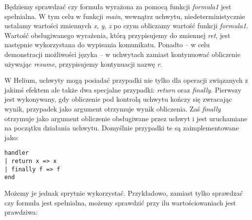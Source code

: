 

Będziemy sprawdzać czy formuła wyrażona za pomocą funkcji \textit{formula1} jest spełnialna. W tym celu w funkcji \textit{main}, wewnątrz uchwytu, niedeterministycznie ustalamy wartości zmiennych \textit{x}, \textit{y}, \textit{z} po czym obliczamy wartość funkcji \textit{formula1}. Wartość obsługiwanego wyrażenia, którą przypisujemy do zmiennej \textit{ret}, jest następnie wykorzystana do wypisania komunikatu. Ponadto -- w celu demonstracji możliwości języka -- w uchwytach zamiast kontynuować obliczenie używając \textit{resume}, przypisujemy kontynuacji nazwę \textit{r}.

W Helium, uchwyty mogą posiadać przypadki nie tylko dla operacji związanych z jakimś efektem ale także dwa specjalne przypadki: \textit{return} oraz \textit{finally}. Pierwszy jest wykonywany, gdy obliczenie pod kontrolą uchwytu kończy się zwracając wynik, przypadek jako argument otrzymuje wynik obliczenia. Zaś \textit{finally} otrzymuje jako argument obliczenie obsługiwane przez uchwyt i jest uruchamiane na początku działania uchwytu. Domyślnie przypadki te są zaimplementowane jako:

\begin{minipage}{\linewidth}\begin{lstlisting}
handler
| return x => x
| finally f => f
end
\end{lstlisting}\end{minipage}

Możemy je jednak sprytnie wykorzystać. Przykładowo, zamiast tylko sprawdzać czy formuła jest spełnialna, możemy sprawdzić przy ilu wartościowaniach jest prawdziwa:





